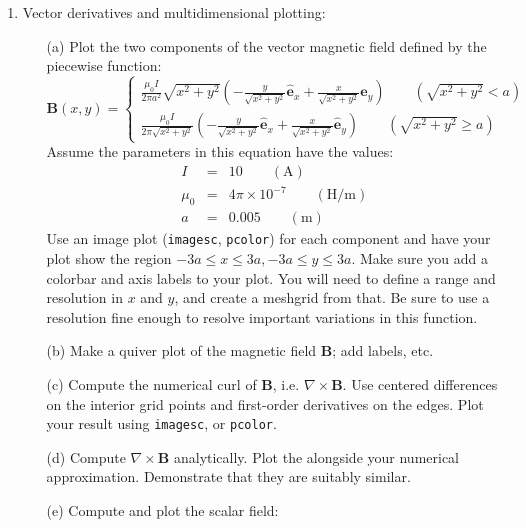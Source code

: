 \documentclass{article}
\begin{document}
\begin{enumerate}
  \item  Vector derivatives and multidimensional plotting:  
  \begin{itemize}  
    \item[(a)] Plot the two components of the vector magnetic field defined by the piecewise function:
    \begin{equation}
      \mathbf{B}(x,y)= \left\{
      \begin{array}{c}
      \frac{\mu_0 I}{2 \pi a^2} \sqrt{x^2+y^2} \left( - \frac{y}{\sqrt{x^2+y^2}}\hat{\mathbf{e}}_x + \frac{x}{\sqrt{x^2+y^2}} \hat{\mathbf{e}}_y \right) \qquad \left( \sqrt{x^2+y^2} < a \right)
      \\
      \frac{\mu_0 I}{2 \pi \sqrt{x^2+y^2}} \left( - \frac{y}{\sqrt{x^2+y^2}} \hat{\mathbf{e}}_x + \frac{x}{\sqrt{x^2+y^2}} \hat{\mathbf{e}}_y \right) \qquad \left( \sqrt{x^2+y^2} \ge a \right)
      \end{array}
      \right.      
    \end{equation}
    Assume the parameters in this equation have the values:
    \begin{eqnarray}
      I &=& 10 \qquad \left( \mathrm{A} \right) \nonumber \\
      \mu_0 &=& 4 \pi \times 10^{-7} \qquad (\mathrm{H/m}) \nonumber \\
      a &=& 0.005 \qquad (\mathrm{m}) \nonumber 
    \end{eqnarray}
    Use an image plot (\texttt{imagesc}, \texttt{pcolor}) for each component and have your plot show the region $-3 a \le x \le 3 a, -3a \le y \le 3a$.  Make sure you add a colorbar and axis labels to your plot.  You will need to define a range and resolution in $x$ and $y$, and create a meshgrid from that.  Be sure to use a resolution fine enough to resolve important variations in this function.  
    \item[(b)]  Make a quiver plot of the magnetic field $\mathbf{B}$; add labels, etc.
    \item[(c)]  Compute the numerical curl of $\mathbf{B}$, i.e. $\nabla \times \mathbf{B}$.  Use centered differences on the interior grid points and first-order derivatives on the edges.  Plot your result using \texttt{imagesc}, or \texttt{pcolor}.  
    \item[(d)]  Compute $\nabla \times \mathbf{B}$ analytically.  Plot the  alongside your numerical approximation.  Demonstrate that they are suitably similar.  
    \item[(e)]  Compute and plot the scalar field:

\end{itemize}
\end{enumerate}
\end{document}
